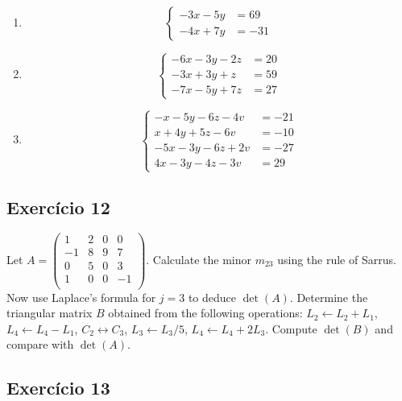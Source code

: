 \begin{enumerate}

\item $$\left\{\begin{aligned}-3x-5y&=69\\-4x+7y&=-31\end{aligned}\right.$$
\item $$\left\{\begin{aligned}-6x-3y-2z&=20\\-3x+3y+z&=59\\-7x-5y+7z&=27\end{aligned}\right.$$
\item
  $$\left\{\begin{aligned}-x-5y-6z-4v&=-21\\x+4y+5z-6v&=-10\\-5x-3y-6z+2v&=-27\\4x-3y-4z-3v&=29\end{aligned}\right.$$

\end{enumerate}

\subsection*{Exercício 12}

Let $A = \begin{pmatrix}
          1 & 2 & 0 & 0   \\
          -1 & 8 & 9 & 7 \\
          0 & 5 & 0 & 3   \\
          1 & 0 & 0 & -1  \\
      \end{pmatrix}$. Calculate the minor $m_{2 3}$ using the rule of Sarrus.
Now use Laplace's formula for $j=3$ to deduce $\det{(A)}$.
Determine the triangular matrix $B$ obtained from the following operations:
$L_2 \leftarrow L_2 + L_1$, $L_4 \leftarrow L_4 - L_1$,
$C_2 \leftrightarrow C_3$, $L_3 \leftarrow L_3 / 5$,
$L_4 \leftarrow L_4 + 2 L_3$. Compute $\det{(B)}$ and compare with
$\det{(A)}$.

\subsection*{Exercício 13}


